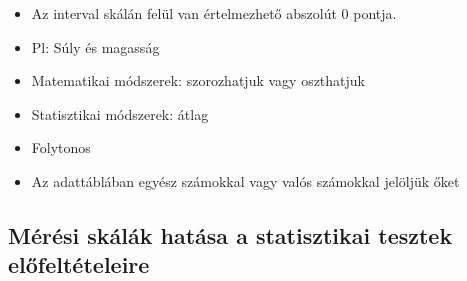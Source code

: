 \documentclass[
  letterpaper,
  DIV=11,
  numbers=noendperiod]{scrreprt}
\begin{document}
\begin{itemize}
\begin{itemize}
    \begin{itemize}
    \item
      Az interval skálán felül van értelmezhető abszolút 0 pontja.
    \item
      Pl: Súly és magasság
    \item
      Matematikai módszerek: szorozhatjuk vagy oszthatjuk
    \item
      Statisztikai módszerek: átlag
    \item
      Folytonos
    \item
      Az adattáblában egyész számokkal vagy valós számokkal jelöljük
      őket
    \end{itemize}
  \end{itemize}
\end{itemize}

\hypertarget{muxe9ruxe9si-skuxe1luxe1k-hatuxe1sa-a-statisztikai-tesztek-elux151feltuxe9teleire}{%
\subsection{Mérési skálák hatása a statisztikai tesztek
előfeltételeire}\label{muxe9ruxe9si-skuxe1luxe1k-hatuxe1sa-a-statisztikai-tesztek-elux151feltuxe9teleire}}
\end{document}
